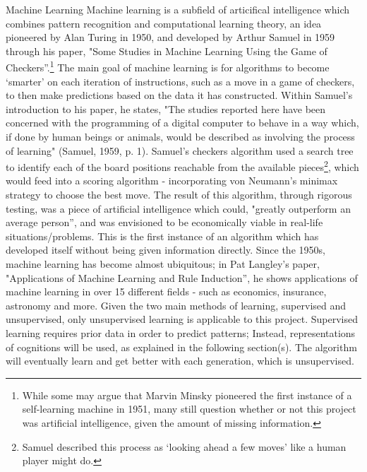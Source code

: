 \documentclass[12pt,a4paper]{article}
\makeatletter
\renewcommand\subsection{\@startsection {subsection}{1}{2mm}
                               {3pt plus 2pt minus 1pt}
                               {3pt plus 0pt}
                               {\normalfont\bfseries}}
\makeatother
\begin{document}
\subsection{Machine Learning}
Machine learning is a subfield of articifical intelligence which combines pattern recognition and computational learning theory, an idea pioneered by Alan Turing in 1950, and developed by Arthur Samuel in 1959 through his paper, "Some Studies in Machine Learning Using the Game of Checkers''.\footnote{While some may argue that Marvin Minsky pioneered the first instance of a self-learning machine in 1951, many still question whether or not this project was artificial intelligence, given the amount of missing information.} The main goal of machine learning is for algorithms to become `smarter' on each iteration of instructions, such as a move in a game of checkers, to then make predictions based on the data it has constructed. Within Samuel's introduction to his paper, he states, "The studies reported here have been concerned with the programming of a digital computer to behave in a way which, if done by human beings or animals, would be described as involving the process of learning" (Samuel, 1959, p. 1). Samuel's checkers algorithm used a search tree to identify each of the board positions reachable from the available pieces\footnote{Samuel described this process as `looking ahead a few moves' like a human player might do.}, which would feed into a scoring algorithm - incorporating von Neumann's minimax strategy to choose the best move. The result of this algorithm, through rigorous testing, was a piece of artificial intelligence which could, "greatly outperform an average person'', and was envisioned to be economically viable in real-life situations/problems. This is the first instance of an algorithm which has developed itself without being given information directly. Since the 1950s, machine learning has become almost ubiquitous; in Pat Langley's paper, "Applications of Machine Learning and Rule Induction'', he shows applications of machine learning in over 15 different fields - such as economics, insurance, astronomy and more. Given the two main methods of learning, supervised and unsupervised, only unsupervised learning is applicable to this project. Supervised learning requires prior data in order to predict patterns; Instead, representations of cognitions will be used, as explained in the following section(s). The algorithm will eventually learn and get better with each generation, which is unsupervised. \\
\end{document}
